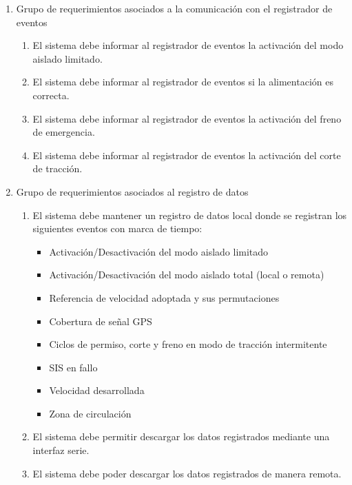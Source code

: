 \begin{enumerate}
    \item Grupo de requerimientos asociados a la comunicación con el registrador de eventos
    \begin{enumerate}
        \item El sistema debe informar al registrador de eventos la activación del modo aislado limitado.
        \item El sistema debe informar al registrador de eventos si la alimentación es correcta.
        \item El sistema debe informar al registrador de eventos la activación del freno de emergencia.
        \item El sistema debe informar al registrador de eventos la activación del corte de tracción.
    \end{enumerate}
       
    \item Grupo de requerimientos asociados al registro de datos
    \begin{enumerate}
        \item El sistema debe mantener un registro de datos local donde se registran los siguientes eventos con marca de tiempo:
        \begin{itemize}
            \item Activación/Desactivación del modo aislado limitado
            \item Activación/Desactivación del modo aislado total (local o remota)
            \item Referencia de velocidad adoptada y sus permutaciones 
            \item Cobertura de señal GPS
            \item Ciclos de permiso, corte y freno en modo de tracción intermitente
            \item SIS en fallo
            \item Velocidad desarrollada
            \item Zona de circulación
        \end{itemize}
        \item El sistema debe permitir descargar los datos registrados mediante una interfaz serie.
        \item El sistema debe poder descargar los datos registrados de manera remota.
    \end{enumerate}
       

\end{enumerate}
